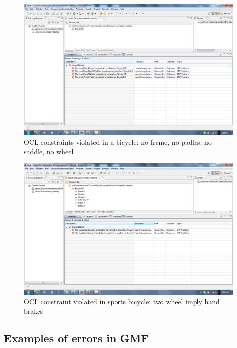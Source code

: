 \begin{figure}[H]
    \begin{center}
        \includegraphics[width=\textwidth]{fig/ocl_examples/ocl_bicycle_model_errors.pdf}
        \caption{OCL constraints violated in a bicycle: no frame, no padles, no
        saddle, no wheel}
        \label{fig.ocl_bike_errors}
    \end{center}
\end{figure}

\begin{figure}[H]
    \begin{center}
        \includegraphics[width=\textwidth]{fig/ocl_examples/ocl_sports_bicycle_wheel_constraint_errors.pdf}
        \caption{OCL constraint violated in sports bicycle: two wheel imply
        hand brakes}
        \label{fig.ocl_ecore_handbreaks}
    \end{center}
\end{figure}

\subsection{Examples of errors in GMF}

